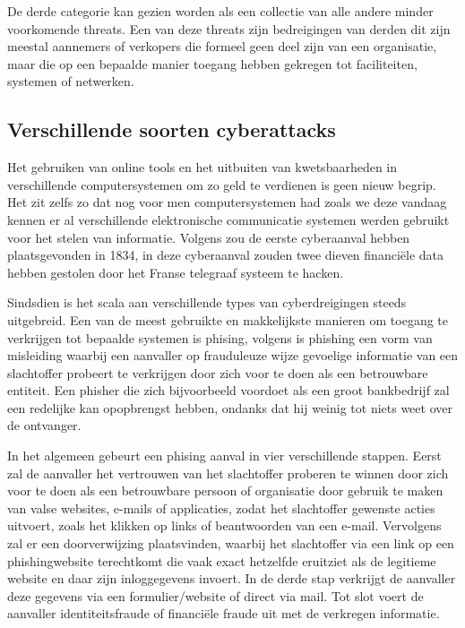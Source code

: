 De derde categorie kan gezien worden als een collectie van alle andere minder voorkomende threats. Een van deze threats zijn bedreigingen van derden dit zijn meestal aannemers of verkopers die formeel geen deel zijn van een organisatie, maar die op een bepaalde manier toegang hebben gekregen tot faciliteiten, systemen of netwerken. \autocite{Cisa2025}



\subsection{Verschillende soorten cyberattacks}
Het gebruiken van online tools en het uitbuiten van kwetsbaarheden in verschillende computersystemen om zo geld te verdienen is geen nieuw begrip. Het zit zelfs zo dat nog voor men computersystemen had zoals we deze vandaag kennen er al verschillende elektronische communicatie systemen werden gebruikt voor het stelen van informatie. Volgens \textcite{Monroe2025} zou de eerste cyberaanval hebben plaatsgevonden in 1834, in deze cyberaanval zouden twee dieven financiële data hebben gestolen door het Franse telegraaf systeem te hacken. 

Sindsdien is het scala aan verschillende types van cyberdreigingen steeds uitgebreid. Een van de meest gebruikte en makkelijkste manieren om toegang te verkrijgen tot bepaalde systemen is phising, volgens \textcite{jagatic2007} is phishing een vorm van misleiding waarbij een aanvaller op frauduleuze wijze gevoelige informatie van een slachtoffer probeert te verkrijgen door zich voor te doen als een betrouwbare entiteit. Een phisher die zich bijvoorbeeld voordoet als een groot bankbedrijf zal een redelijke kan opopbrengst hebben, ondanks dat hij weinig tot niets weet over de ontvanger. 

In het algemeen gebeurt een phising aanval in vier verschillende stappen. Eerst zal de aanvaller het vertrouwen van het slachtoffer proberen te winnen door zich voor te doen als een betrouwbare persoon of organisatie door gebruik te maken van valse websites, e-mails of applicaties, zodat het slachtoffer gewenste acties uitvoert, zoals het klikken op links of beantwoorden van een e-mail. Vervolgens zal er een doorverwijzing plaatsvinden, waarbij het slachtoffer via een link op een phishingwebsite terechtkomt die vaak exact hetzelfde eruitziet als de legitieme website en daar zijn inloggegevens invoert. In de derde stap verkrijgt de aanvaller deze gegevens via een formulier/website of direct via mail. Tot slot voert de aanvaller identiteitsfraude of financiële fraude uit met de verkregen informatie. \autocite{varshney2024}

